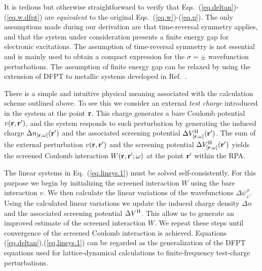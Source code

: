 \documentclass[twocolumn,prb,showpacs,superscriptaddress]{revtex4}
\def\s1{\hspace{0.5cm}}
\def\s2{\hspace{1cm}}
\def\w{\omega}
\def\s{\sigma}
\def\r{{\bf r}}
\def\rp{{\bf r^\prime}}
\begin{document}
It is tedious but otherwise straightforward to verify that 
Eqs.\ (\ref{eq.deltan})-(\ref{eq.w.dfpt}) are {\it equivalent} to the 
original Eqs.\ (\ref{eq.w})-(\ref{eq.p}).
The only assumptions made during our derivation are that 
time-reversal symmetry applies,
and that the system under consideration presents a finite 
energy gap for electronic excitations. 
The assumption of time-reversal symmetry is not essential and is mainly used to
obtain a compact expression for the $\sigma=\pm$ wavefunction perturbations.
The assumption of finite energy gap can be relaxed by using the extension
of DFPT to metallic systems developed in Ref.\ . 


There is a simple and intuitive physical meaning associated with 
the calculation scheme outlined above. To see this
we consider an external {\it test charge} introduced in the system
at the point $\r$. This charge generates a bare Coulomb potential $v(\r,\rp)$,
and the system responds to such perturbation by generating the induced charge
$\Delta n_{[\r,\w]}(\rp)$ and the associated 
screening potential $\Delta V^{\rm H}_{[\r,\w]}(\rp)$.
The sum of the external perturbation $v(\r,\rp)$ and the screening
potential $\Delta V^{\rm H}_{[\r,\w]}(\rp)$ yields the screened Coulomb
interaction $W(\r,\rp;\w)$ at the point $\rp$ within the RPA.

The linear systems in Eq.\ (\ref{eq.linsys.1}) must be solved self-consistently.
For this purpose we begin by initializing the screened
interaction $W$ using the bare interaction $v$. 
We then calculate the linear variations of the wavefunctions $\Delta \psi_v^\sigma$.
Using the calculated linear variations we update the induced charge density $\Delta n$
and the associated screening potential $\Delta V^{\rm H}$. This allow us to
generate an improved estimate of the screened interaction $W$.
We repeat these steps until convergence of the screened Coulomb
interaction is achieved.
Equations (\ref{eq.deltan}),(\ref{eq.linsys.1}) can be regarded as
the generalization of the DFPT equations used for lattice-dynamical 
calculations\cite{baroni.rmp} to finite-frequency test-charge perturbations.
\end{document}
